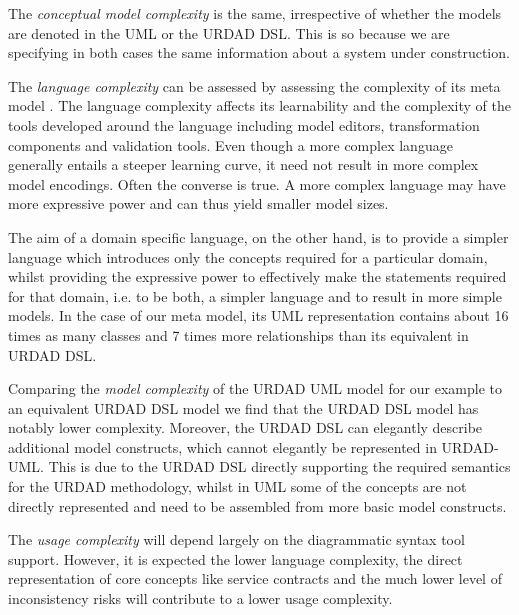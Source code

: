 The \emph{conceptual model complexity} is the same, irrespective  of whether the models are denoted in the UML or the URDAD DSL. This is so because we are specifying in both cases the same information about a system under construction.

The \emph{language complexity} can be assessed by assessing the complexity of its meta model \cite{mohagheghi_evaluating_2007}. The language complexity affects its learnability and the complexity  of the tools developed around the language including model editors, transformation components and validation tools. Even though a more complex language generally entails a steeper learning curve, it need not result in more complex model encodings. Often the converse is true. A more complex language may have more expressive power and can thus yield smaller model sizes. 

The aim of a domain specific language, on the other hand, is to provide a simpler language which introduces only the concepts required for a particular domain, whilst providing the expressive power to effectively make the statements required for that domain, i.e. to be both, a simpler language and to result in more simple models. In the case of our meta model, its UML representation contains about 16 times as many classes and 7 times more relationships than its equivalent in URDAD DSL. 

Comparing the \emph{model complexity} of the URDAD UML model for our example to an equivalent URDAD DSL model we find that the URDAD DSL model has notably lower complexity. Moreover, the URDAD DSL can elegantly describe additional model constructs, which cannot elegantly be represented in URDAD-UML. This is due to the URDAD DSL directly supporting the required semantics for the URDAD methodology, whilst in UML some of the concepts are not directly represented and need to be assembled from more basic model constructs.

The \emph{usage complexity} will depend largely on the diagrammatic syntax tool support. However, it is expected the lower language complexity, the direct representation of core concepts like service contracts and the much lower level of inconsistency risks will contribute to a lower usage complexity.
